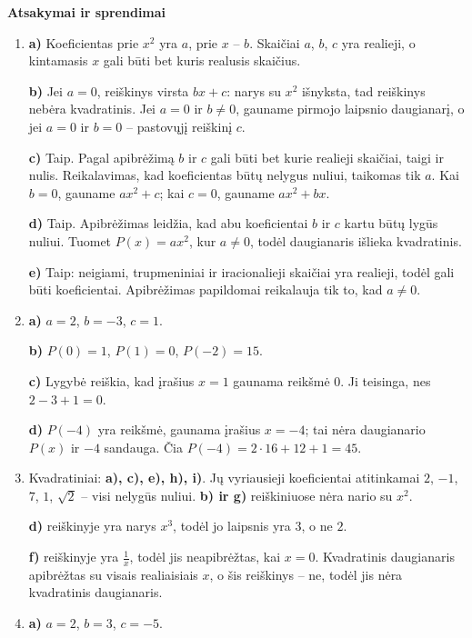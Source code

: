 \documentclass[12pt,a4paper]{exam}
\begin{document}
\newpage
\begin{center}{\Large\bfseries Atsakymai ir sprendimai}\end{center}
\begin{enumerate}
\item

\textbf{a)} Koeficientas prie $x^2$ yra $a$, prie $x$ – $b$. Skaičiai $a$, $b$, $c$ yra realieji, o kintamasis $x$ gali būti bet kuris realusis skaičius.

\textbf{b)} Jei $a=0$, reiškinys virsta $bx+c$: narys su $x^2$ išnyksta, tad reiškinys nebėra kvadratinis. Jei $a=0$ ir $b\ne0$, gauname pirmojo laipsnio daugianarį, o jei $a=0$ ir $b=0$ – pastovųjį reiškinį $c$.

\textbf{c)} Taip. Pagal apibrėžimą $b$ ir $c$ gali būti bet kurie realieji skaičiai, taigi ir nulis. Reikalavimas, kad koeficientas būtų nelygus nuliui, taikomas tik $a$. Kai $b=0$, gauname $ax^2+c$; kai $c=0$, gauname $ax^2+bx$.

\textbf{d)} Taip. Apibrėžimas leidžia, kad abu koeficientai $b$ ir $c$ kartu būtų lygūs nuliui. Tuomet $P(x)=ax^2$, kur $a\ne0$, todėl daugianaris išlieka kvadratinis.

\textbf{e)} Taip: neigiami, trupmeniniai ir iracionalieji skaičiai yra realieji, todėl gali būti koeficientai. Apibrėžimas papildomai reikalauja tik to, kad $a\ne0$.
\item

\textbf{a)} $a=2$, $b=-3$, $c=1$.

\textbf{b)} $P(0)=1$, $P(1)=0$, $P(-2)=15$.

\textbf{c)} Lygybė reiškia, kad įrašius $x=1$ gaunama reikšmė $0$. Ji teisinga, nes $2-3+1=0$.

\textbf{d)} $P(-4)$ yra reikšmė, gaunama įrašius $x=-4$; tai nėra daugianario $P(x)$ ir $-4$ sandauga. Čia $P(-4)=2\cdot16+12+1=45$.
\item Kvadratiniai: \textbf{a), c), e), h), i)}. Jų vyriausieji koeficientai atitinkamai $2$, $-1$, $7$, $1$, $\sqrt2$ – visi nelygūs nuliui. \textbf{b) ir g)} reiškiniuose nėra nario su $x^2$.

\textbf{d)} reiškinyje yra narys $x^3$, todėl jo laipsnis yra $3$, o ne $2$.

\textbf{f)} reiškinyje yra $\frac{1}{x}$, todėl jis neapibrėžtas, kai $x=0$. Kvadratinis daugianaris apibrėžtas su visais realiaisiais $x$, o šis reiškinys – ne, todėl jis nėra kvadratinis daugianaris.
\item

\textbf{a)} $a=2$, $b=3$, $c=-5$.


\end{enumerate}
\end{document}
